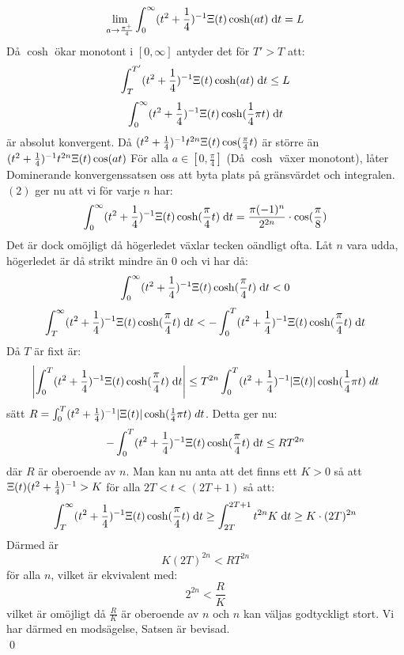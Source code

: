 \documentclass[a4paper]{article}%
\begin{document}
\newcommand{\thisint} {
	(t^2 + \frac 1 4)^{-1} \skit\cosh
}
\[
	\lim_{a \to \frac {\pi^+} {4}} \int_0^\infty \thisint(at) \ud t = L
\]
Då $\cosh$ ökar monotont i $[0, \infty]$ antyder det för $T' > T$ att:
\[
	\int_T^{T'}\thisint(at) \ud t \leq L
\]
\[
	\int_0^\infty\thisint(\frac 1 4 \pi t) \ud t
\]
\newcommand{\myeq}[1]{
	(t^2 + \frac 1 4)^{-1}t^{2n}\skit\cos(#1)
}
är absolut konvergent. Då $\myeq{\frac \pi 4 t}$ är större än $\myeq{at}$ För alla $a \in [0, \frac \pi 4]$ (Då $\cosh$ växer monotont), låter
Dominerande konvergenssatsen oss att byta plats på gränsvärdet och integralen. $(2)$ ger nu att vi för varje $n$ har:
\[
	\int_0^\infty \thisint(\frac \pi 4 t) \ud t = \frac {\pi (-1)^n} {2^{2n}} \cdot \cos(\frac \pi 8)
\]
Det är dock omöjligt då högerledet växlar tecken oändligt ofta. Låt $n$ vara udda,
högerledet är då strikt mindre än $0$ och vi har då:
\newcommand{\thislaser}[2]{
	\int_{#1}^{#2}\thisint(\frac \pi 4 t) \ud t
}
\[
	\thislaser{0}{\infty} < 0
\]
\[
	\thislaser{T}{\infty} < -\thislaser{0}{T}
\]
Då $T$ är fixt är:
\[
	\left |
		\thislaser{0}{T}
	\right |
	\leq T^{2n} \int_0^T (t^2 + \frac 1 4)^{-1} |\skit|\cosh(\frac 1 4 \pi t) \; dt %
\]
sätt $R = \int_0^T (t^2 + \frac 1 4)^{-1} |\Xi(t)|\cosh(\frac 1 4 \pi t) \; dt$. Detta ger nu:
\[
	-\thislaser 0 T \leq RT^{2n}
\]
där $R$ är oberoende av $n$. Man kan nu anta att det finns ett $K > 0$ så att
$\Xi(t)(t^2 + \frac 1 4)^{-1} > K$ för alla $2T < t < (2T + 1)$ så att:
\[
	\thislaser T \infty \geq \int_{2T}^{2T + 1} t^{2n} K \ud t \geq K \cdot (2T)^{2n}
\]
Därmed är
\[
	K(2T)^{2n} < RT^{2n}
\]
för alla $n$, vilket är ekvivalent med:
\[
	2^{2n} < \frac R K
\]
vilket är omöjligt då $\frac R K$ är oberoende
av $n$ och $n$ kan väljas godtyckligt stort.
Vi har därmed en modsägelse, Satsen är bevisad.\\
\hfill\qed

\end{document}
